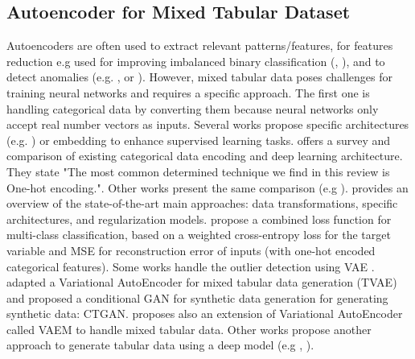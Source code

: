 \documentclass{article}
\theoremstyle{definition}
\begin{document}
\subsection{Autoencoder for Mixed Tabular Dataset}
Autoencoders are often used to extract relevant patterns/features, for features reduction e.g used for improving imbalanced binary classification (\citep{tomescu2021study}, \citep{arafa2023rn}), and to detect anomalies (e.g. \citep{yamanaka2019autoencoding}, \citep{chen2018autoencoder} or \citep{eduardo2020robust}).
However, mixed tabular data poses challenges for training neural networks and requires a specific approach. The first one is handling categorical data by converting them because neural networks only accept real number vectors as inputs. 
Several works propose specific architectures (e.g. \citep{delong2023use}) or embedding to enhance supervised learning tasks. \citep{hancock2020survey} offers a survey and comparison of existing categorical data encoding and deep learning architecture. They state "The most common determined technique we find in this review is One-hot encoding.". Other works present the same comparison (e.g \citep{potdar2017comparative}). \citep{borisov2022deep} provides an overview of the state-of-the-art main approaches: data transformations, specific architectures, and regularization models.
\citep{zhang2021auto} propose a combined loss function for multi-class classification, based on a weighted cross-entropy loss for the target variable and MSE for reconstruction error of inputs (with one-hot encoded categorical features). Some works handle the outlier detection using VAE \citep{eduardo2020robust}.
\citep{xu2019modeling} adapted a Variational AutoEncoder for mixed tabular data generation (TVAE) and proposed a conditional GAN for synthetic data generation for generating synthetic data: CTGAN. \citep{ma2020vaem} proposes also an extension of Variational AutoEncoder called VAEM to handle mixed tabular data. Other works propose another approach to generate tabular data using a deep model (e.g \citep{vardhan2020synthetic}, \citep{zhang2023mixed}).










\end{document}
